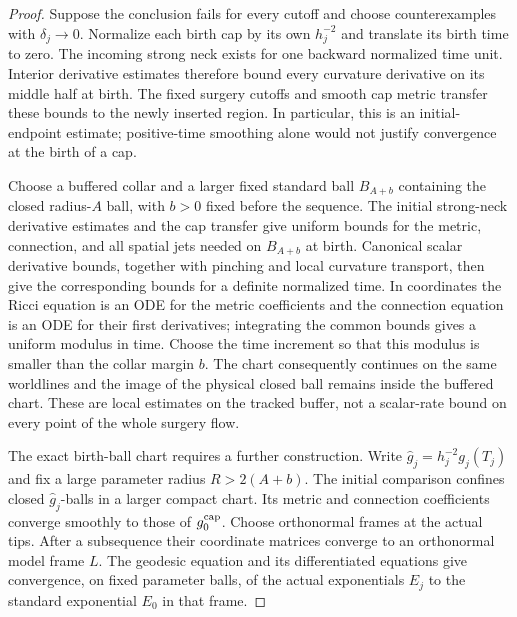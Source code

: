 \begin{proof}
Suppose the conclusion fails for every cutoff and choose counterexamples
with $\delta_j\to0$.  Normalize each birth cap by its own $h_j^{-2}$
and translate its birth time to zero.  The incoming strong neck exists
for one backward normalized time unit.  Interior derivative estimates
therefore bound every curvature derivative on its middle half at
birth.  The fixed surgery cutoffs and smooth cap metric transfer these
bounds to the newly inserted region.  In particular, this is an
initial-endpoint estimate; positive-time smoothing alone would not
justify convergence at the birth of a cap.

Choose a buffered collar and a larger fixed standard ball
$B_{A+b}$ containing the closed radius-$A$ ball, with $b>0$ fixed
before the sequence.  The initial strong-neck derivative estimates and
the cap transfer give uniform bounds for the metric, connection, and all
spatial jets needed on $B_{A+b}$ at birth.  Canonical scalar derivative
bounds, together with pinching and local curvature transport, then give
the corresponding bounds for a definite normalized time.  In coordinates
the Ricci equation is an ODE for the metric coefficients and the
connection equation is an ODE for their first derivatives; integrating
the common bounds gives a uniform modulus in time.  Choose the time
increment so that this modulus is smaller than the collar margin $b$.
The chart consequently continues on the same worldlines and the image
of the physical closed ball remains inside the buffered chart.  These
are local estimates on the tracked buffer, not a scalar-rate bound on
every point of the whole surgery flow.

The exact birth-ball chart requires a further construction. Write
$\widehat g_j=h_j^{-2}g_j(T_j)$ and fix a large parameter radius $R>2(A+b)$.
The initial comparison confines closed $\widehat g_j$-balls in a larger
compact chart. Its metric and connection coefficients converge smoothly
to those of $g_0^{\rm cap}$. Choose orthonormal frames at the actual tips.
After a subsequence their coordinate matrices converge to an orthonormal
model frame $L$. The geodesic equation and its differentiated equations
give convergence, on fixed parameter balls, of the actual exponentials
$E_j$ to the standard exponential $E_0$ in that frame.


\end{proof}
